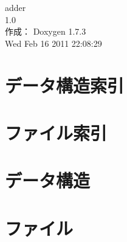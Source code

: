 \documentclass[a4paper]{book}
\begin{document}
\hypersetup{pageanchor=false}
\begin{titlepage}
\vspace*{7cm}
\begin{center}
{\Large adder \\[1ex]\large 1.0 }\\
\vspace*{1cm}
{\large 作成： Doxygen 1.7.3}\\
\vspace*{0.5cm}
{\small Wed Feb 16 2011 22:08:29}\\
\end{center}
\end{titlepage}
\clearemptydoublepage
{}
\tableofcontents
\clearemptydoublepage
{}
\hypersetup{pageanchor=true}
\chapter{データ構造索引}

\chapter{ファイル索引}

\chapter{データ構造}















\chapter{ファイル}


























\printindex
\end{document}
